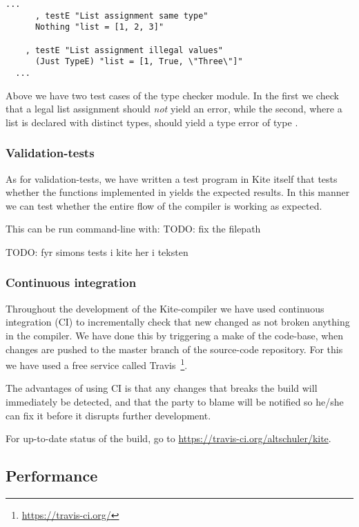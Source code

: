 \begin{lstlisting}[caption=\code{Kite.Test.TypeCheck.hs} snippet]
  ...
      , testE "List assignment same type"
      Nothing "list = [1, 2, 3]"

    , testE "List assignment illegal values"
      (Just TypeE) "list = [1, True, \"Three\"]"
  ...
\end{lstlisting}

Above we have two test cases of the type checker module. In the first
we check that a legal list assignment should \emph{not} yield an
error, while the second, where a list is declared with distinct types,
should yield a type error of type .

\subsubsection{Validation-tests}

As for validation-tests, we have written a test program in Kite itself that tests whether the functions implemented in  yields the expected results. In this manner we can test whether the entire flow of the compiler is working as expected.

This can be run command-line with:  TODO: fix the filepath


TODO: fyr simons tests i kite her i teksten


\subsubsection{Continuous integration}
Throughout the development of the Kite-compiler we have used
continuous integration (CI) to incrementally check that new changed as
not broken anything in the compiler. We have done this by triggering a
make of the code-base, when changes are pushed to the master branch of
the source-code repository. For this we have used a free service
called Travis~\footnote{\url{https://travis-ci.org/}}.

The advantages of using CI is that any changes that breaks the build
will immediately be detected, and that the party to blame will be
notified so he/she can fix it before it disrupts further development.


For up-to-date status of the build, go to \url{https://travis-ci.org/altschuler/kite}.


\subsection{Performance}

